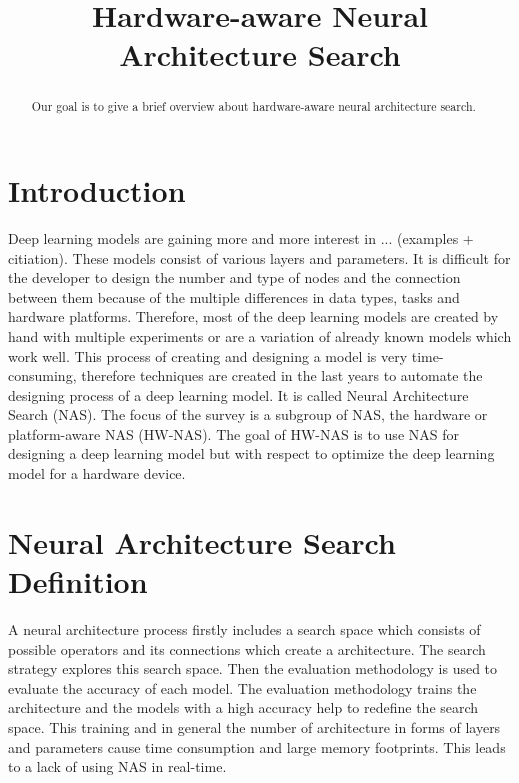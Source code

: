 \documentclass[conference]{IEEEtran}
\begin{document}
\title{Hardware-aware Neural Architecture Search\\}

\author{
}

\maketitle

\begin{abstract}
Our goal is to give a brief overview about hardware-aware neural architecture search. 
\end{abstract}

\begin{IEEEkeywords}

\end{IEEEkeywords}

\section{Introduction}
Deep learning models are gaining more and more interest in ... (examples + citiation). These models consist of various layers and parameters. It is difficult for the developer to design the number and type of nodes and the connection between them because of the multiple differences in data types, tasks and hardware platforms. Therefore, most of the deep learning models are created by hand with multiple experiments or are a variation of already known models which work well. This process of creating and designing a model is very time-consuming, therefore techniques are created in the last years to automate the designing process of a deep learning model. It is called Neural Architecture Search (NAS). The focus of the survey is a subgroup of NAS, the hardware or platform-aware NAS (HW-NAS). The goal of HW-NAS is to use NAS for designing a deep learning model but with respect to optimize the deep learning model for a hardware device.  

\section{Neural Architecture Search Definition}
A neural architecture process firstly includes a search space which consists of possible operators and its connections which create a architecture. The search strategy explores this search space. Then the evaluation methodology is used to evaluate the accuracy of each model. The evaluation methodology trains the architecture and the models with a high accuracy help to redefine the search space. This training and in general the  number of architecture in forms of layers and parameters cause time consumption and large memory footprints. This leads to a lack of using NAS in real-time. 
\end{document}
